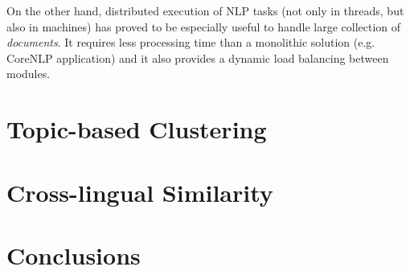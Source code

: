 On the other hand, distributed execution of NLP tasks (not only in threads, but also in machines) has proved to be especially useful to handle large collection of \textit{documents}. It requires less processing time than a monolithic solution (e.g. CoreNLP application) and it also provides a dynamic load balancing between modules.


\section{Topic-based Clustering}

\section{Cross-lingual Similarity}

\section{Conclusions}